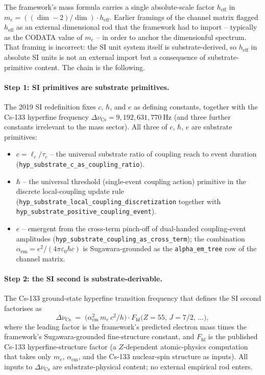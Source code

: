 ﻿\documentclass[reprint,amsmath,amssymb,aps,prd,longbibliography,floatfix]{revtex4-2}
\begin{document}
The framework's mass formula carries a single absolute-scale factor
$h_\mathrm{eff}$ in $m_e = ((\dim - 2)/\dim) \cdot h_\mathrm{eff}$.
Earlier framings of the channel matrix flagged $h_\mathrm{eff}$ as an
external dimensional rod that the framework had to import -- typically
as the CODATA value of $m_e$ -- in order to anchor the dimensionful
spectrum. That framing is incorrect: the SI unit system itself is
substrate-derived, so $h_\mathrm{eff}$ in absolute SI units is not an
external import but a consequence of substrate-primitive content. The
chain is the following.

\paragraph{Step 1: SI primitives are substrate primitives.} The 2019
SI redefinition fixes $c$, $\hbar$, and $e$ as defining constants,
together with the Cs-133 hyperfine frequency $\Delta\nu_\mathrm{Cs} =
9{,}192{,}631{,}770~\mathrm{Hz}$ (and three further constants
irrelevant to the mass sector). All three of $c$, $\hbar$, $e$ are
substrate primitives:
\begin{itemize}
\item $c = \ell_c / \tau_c$ -- the universal substrate ratio of
coupling reach to event duration
(\texttt{hyp\_substrate\_c\_as\_coupling\_ratio}).
\item $\hbar$ -- the universal threshold (single-event coupling
action) primitive in the discrete local-coupling update rule
(\texttt{hyp\_substrate\_local\_coupling\_discretization}
together with \texttt{hyp\_substrate\_positive\_coupling\_event}).
\item $e$ -- emergent from the cross-term pinch-off of dual-handed
coupling-event amplitudes
(\texttt{hyp\_substrate\_coupling\_as\_cross\_term}); the
combination $\alpha_\mathrm{em} = e^2 / (4\pi\varepsilon_0\hbar c)$ is
Sugawara-grounded as the \texttt{alpha\_em\_tree} row of the
channel matrix.
\end{itemize}

\paragraph{Step 2: the SI second is substrate-derivable.} The Cs-133
ground-state hyperfine transition frequency that defines the SI second
factorises as
\[
  \Delta\nu_\mathrm{Cs} \;=\;
  \bigl( \alpha_\mathrm{em}^{2}\, m_e\, c^{2} / h \bigr) \cdot
  F_\mathrm{hf}\bigl( Z = 55,\, J = 7/2,\, \dots \bigr),
\]
where the leading factor is the framework's predicted electron mass
times the framework's Sugawara-grounded fine-structure constant, and
$F_\mathrm{hf}$ is the published Cs-133 hyperfine-structure factor (a
$Z$-dependent atomic-physics computation that takes only $m_e$,
$\alpha_\mathrm{em}$, and the Cs-133 nuclear-spin structure as inputs).
All inputs to $\Delta\nu_\mathrm{Cs}$ are substrate-physical content;
no external empirical rod enters.
\end{document}
